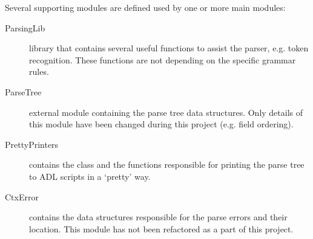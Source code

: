   \noindent
  Several supporting modules are defined used by one or more main modules:
  \begin{description}
    \item[ParsingLib] library that contains several useful functions to assist the parser, e.g. token recognition.
      These functions are not depending on the specific grammar rules.
      
    \item[ParseTree] external module containing the parse tree data structures.
      Only details of this module have been changed during this project (e.g. field ordering).
    
    \item[PrettyPrinters] contains the  class and the functions responsible for printing the parse tree to ADL scripts in a `pretty' way.
    \item[CtxError] contains the data structures responsible for the parse errors and their location.
      This module has not been refactored as a part of this project.
    
  \end{description}
